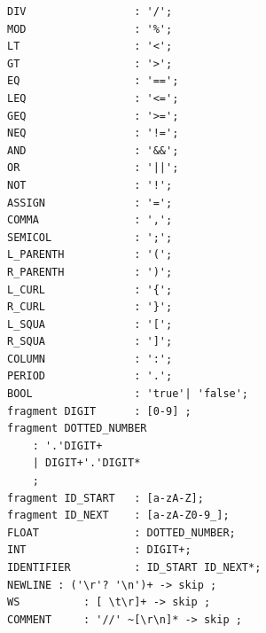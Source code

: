 \documentclass{article}
\begin{document}
\begin{verbatim}
DIV                 : '/';
MOD                 : '%';
LT                  : '<';
GT                  : '>';
EQ                  : '==';
LEQ                 : '<=';
GEQ                 : '>=';
NEQ                 : '!=';
AND                 : '&&';
OR                  : '||';
NOT                 : '!';
ASSIGN              : '=';
COMMA               : ',';
SEMICOL             : ';';
L_PARENTH           : '(';
R_PARENTH           : ')';
L_CURL              : '{';
R_CURL              : '}';
L_SQUA              : '[';
R_SQUA              : ']';
COLUMN              : ':';
PERIOD              : '.';
BOOL                : 'true'| 'false';
fragment DIGIT      : [0-9] ;
fragment DOTTED_NUMBER
    : '.'DIGIT+
    | DIGIT+'.'DIGIT*
    ;
fragment ID_START   : [a-zA-Z];
fragment ID_NEXT    : [a-zA-Z0-9_];
FLOAT               : DOTTED_NUMBER;
INT                 : DIGIT+;
IDENTIFIER          : ID_START ID_NEXT*;
NEWLINE : ('\r'? '\n')+ -> skip ;
WS          : [ \t\r]+ -> skip ;
COMMENT     : '//' ~[\r\n]* -> skip ;
\end{verbatim}
\end{document}
